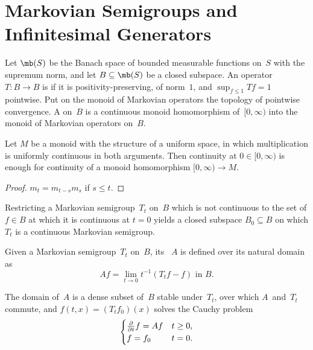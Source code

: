 \section	{Markovian Semigroups and Infinitesimal Generators}

\begin	{definition}
Let $\mb(S)$ be the Banach space of bounded measurable functions on~$S$
with the supremum norm,
and let \( B \subseteq \mb(S) \) be a closed subspace.
An operator \( T \colon B \to B \) is 
if it is positivity-preserving, of norm~$1$,
and \( \sup_{f\le1} Tf = 1 \) pointwise.
Put on the monoid of Markovian operators
the topology of pointwise convergence.
A  on~$B$ is a continuous monoid homomorphism
of~$[0,\infty)$ into the monoid of Markovian operators on~$B$.
\end	{definition}

\begin	{lemma}
Let $M$ be a monoid with the structure of a uniform space,
in which multiplication is uniformly continuous in both arguments.
Then continuity at \( 0 \in [0,\infty) \)
is enough for continuity of a monoid homomorphism
\( [0,\infty) \to M \).
\end	{lemma}
\begin	{proof}
\( m_t = m_{t-s} m_s \) if \( s \le t \).
\end	{proof}

\begin	{proposition}
Restricting a Markovian semigroup~$T_t$ on~$B$ which is not continuous
to the set of \( f \in B \) at which it is continuous at \( t = 0 \)
yields a closed subspace \( B_0 \subseteq B \)
on which $T_t$ is a continuous Markovian semigroup.
\end	{proposition}

\begin	{definition}
Given a Markovian semigroup~$T_t$ on~$B$,
its ~$A$ is defined over its natural domain as \[
	\text{\(Af = \lim_{t\to0} t^{-1}(T_t f - f)\) in~$B$.}
\]
\end	{definition}

\begin	{theorem}
The domain of~$A$ is a dense subset of~$B$ stable under~$T_t$,
over which $A$~and~$T_t$ commute,
and \( f(t,x) = (T_t f_0)(x) \) solves the Cauchy problem \[
	\begin	{cases}
	\frac\partial{\partial t} f = Af & t \ge 0 \text,\\
	f = f_0                          & t =   0 \text.
	\end	{cases}
\]
\end	{theorem}

